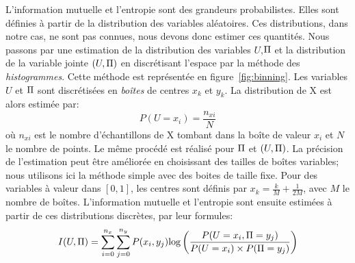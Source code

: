 L'information mutuelle et l'entropie sont des grandeurs probabilistes. Elles sont définies à partir de la distribution des variables aléatoires. Ces distributions, dans notre cas, ne sont pas connues, nous devons donc estimer ces quantités.
Nous passons par une estimation de la distribution des variables $U$,$\Pi$ et la distribution de la variable jointe $(U,\Pi)$ en discrétisant l'espace par la méthode des \emph{histogrammes}.
Cette méthode est représentée en figure~\ref{fig:binning}. Les variables $U$ et $\Pi$ sont discrétisées en \emph{boîtes} de centres $x_k$ et $y_k$.
La distribution de X est alors estimée par: 
$$P(U = x_i) = \frac{n_{xi}}{N} $$ où $n_{xi}$ est le nombre d'échantillons de X tombant dans la boîte de valeur $x_i$ et $N$ le nombre de points. Le même procédé est réalisé pour $\Pi$ et $(U,\Pi)$. La précision de l'estimation peut être améliorée en choisissant des tailles de boîtes variables; nous utilisons ici la méthode simple avec des boites de taille fixe. Pour des variables à valeur dans $[0,1]$, les centres sont définis par $x_k = \frac{k}{M}+\frac{1}{2M}$, avec $M$ le nombre de boîtes.
L'information mutuelle et l'entropie sont ensuite estimées à partir de ces distributions discrètes, par leur formules:
\begin{equation}
    I(U,\Pi) = \sum_{i = 0}^{n_x} \sum_{j=0}^{n_y} {P(x_i,y_j)\textrm{log}\left(\frac{P(U = x_i,\Pi = y_j)}{P(U = x_i)\times P(\Pi = y_j)}\right)}
   \end{equation}

